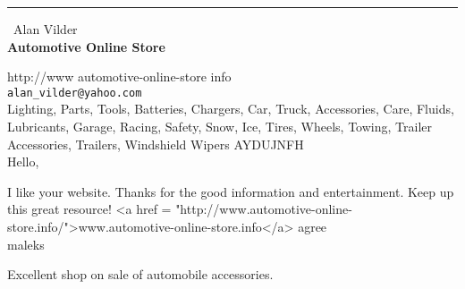 \documentclass{report}
\begin{document}
\begin{center}
\rule{6in}{1pt} \
{\large Alan Vilder \\
{\bf Automotive Online Store}}

http://www automotive-online-store info
\\
{\tt alan_vilder@yahoo.com}\\
Lighting, Parts, Tools, Batteries, Chargers, Car, Truck, Accessories, Care, Fluids, Lubricants, Garage, Racing, Safety, Snow, Ice, Tires, Wheels, Towing, Trailer Accessories, Trailers, Windshield Wipers AYDUJNFH\\
Hello,

I like your website. Thanks for the good information and entertainment. Keep up this great resource!
<a href = "http://www.automotive-online-store.info/">www.automotive-online-store.info</a> agree\\
	maleks\end{center}

Excellent shop on sale of automobile accessories.
\end{document}
